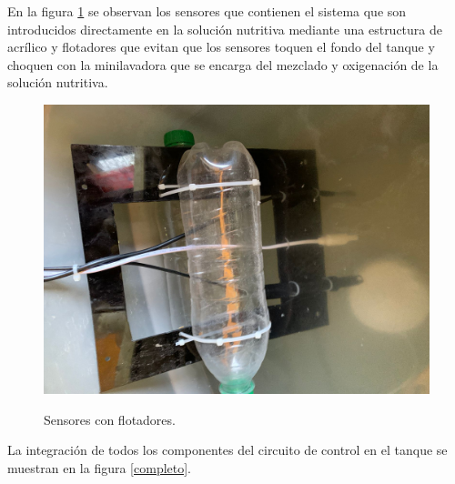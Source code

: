 En la figura \ref{flotador} se observan los sensores que contienen el sistema que son introducidos directamente en la solución nutritiva mediante una estructura de acrílico y flotadores que evitan que los sensores toquen el fondo del tanque y choquen con la minilavadora que se encarga del mezclado y oxigenación de la solución nutritiva.
 \begin{figure}[H]
\centering
         \includegraphics[scale=0.15]{imgs/flotador.jpg} \\
    \caption{Sensores con flotadores. }\label{flotador}
\end{figure}
La integración de todos los componentes del circuito de control en el tanque se muestran en la figura \ref{completo}. 
